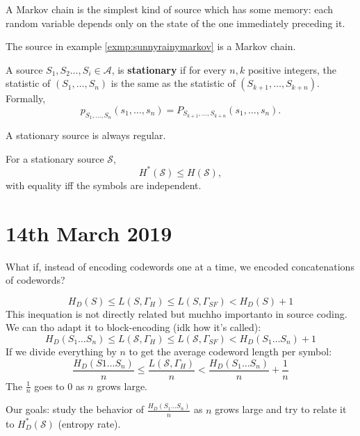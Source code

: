 \documentclass{report}
\begin{document}
\begin{defn}
	A Markov chain is the simplest kind of source which has some memory: each random variable depends only on the state of the one immediately preceding it.
\end{defn}
\begin{remark}
	The source in example \ref{exmp:sunnyrainymarkov} is a Markov chain.
\end{remark}

\begin{defn}
	A source $S_1,  S_2 \ldots, S_i \in \mathcal A$, is \textbf{stationary} if for every $n, k$ positive integers, the statistic of $(S_1, \ldots, S_n)$ is the same as the statistic of $(S_{k+1}, \ldots, S_{k+n})$. Formally,
	\begin{equation}
		p_{S_1, \ldots, S_n}(s_1, \ldots, s_n) = P_{S_{k+1}, \ldots, S_{k+n}}(s_1, \ldots, s_n).
	\end{equation}
\end{defn}

\begin{thm}
	A stationary source is always regular.
\end{thm}

\begin{thm}
	For a stationary source $\mathcal S$,
	\begin{equation}
		H^*(\mathcal S) \leq H(\mathcal S),
	\end{equation}
	with equality iff the symbols are independent.
\end{thm}

\section{14th March 2019}
	What if, instead of encoding codewords one at a time, we encoded concatenations of codewords?

\begin{equation}
	\boxed{H_D(S) \leq L(S, \Gamma_H) \leq L(S, \Gamma_{SF}) < H_D(S) + 1}
\end{equation}
This inequation is not directly related but muchho importanto in source coding. We can tho adapt it to block-encoding (idk how it's called):
\begin{equation}
	H_D(S_1 \ldots S_n) \leq L(\mathcal S, \Gamma_H) \leq L(\mathcal S, \Gamma_{SF}) < H_D(S_1 \ldots S_n) + 1
\end{equation}
If we divide everything by $n$ to get the average codeword length per symbol:
\begin{equation}
	\frac{H_D(S1 \ldots S_n)}{n} \leq \frac{L(\mathcal S, \Gamma_H)}{n} < \frac{H_D(S_1 \ldots S_n)}{n} + \frac1n
\end{equation}
The $\frac1n$ goes to 0 as $n$ grows large. \par
Our goals: study the behavior of $\frac{H_D(S_1 \ldots S_n)}{n}$ as $n$ grows large and try to relate it to $H_D^*(\mathcal S)$ (entropy rate).
\end{document}

